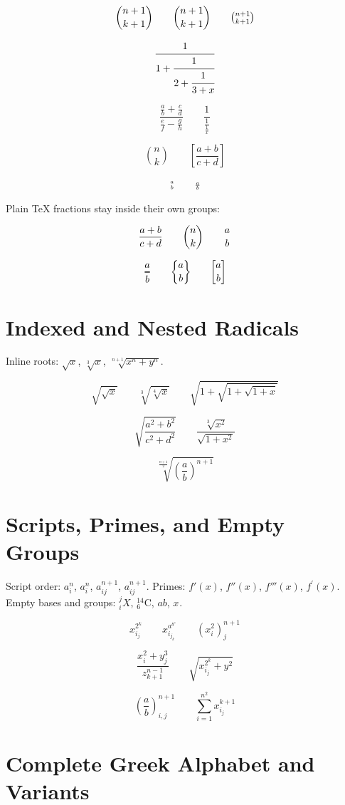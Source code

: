 \documentclass[12pt]{article}
\begin{document}
\[
\binom{n+1}{k+1} \qquad \dbinom{n+1}{k+1} \qquad \tbinom{n+1}{k+1}
\]

\[
\cfrac{1}{1+\cfrac{1}{2+\cfrac{1}{3+x}}}
\]

\[
\frac{\frac{a}{b}+\frac{c}{d}}{\frac{e}{f}-\frac{g}{h}}
\qquad \frac{1}{\frac{1}{\frac{1}{x}}}
\]

\[
\genfrac{(}{)}{0pt}{0}{n}{k}
\qquad \genfrac{[}{]}{0.8pt}{1}{a+b}{c+d}
\]

\[
\genfrac{}{}{0pt}{2}{a}{b}
\qquad \genfrac{}{}{0.4pt}{3}{a}{b}
\]

Plain TeX fractions stay inside their own groups:

\[
{a+b \over c+d} \qquad {n \choose k} \qquad {a \atop b}
\]

\[
{a \above 1pt b} \qquad {a \brace b} \qquad {a \brack b}
\]

\section{Indexed and Nested Radicals}

Inline roots: $\sqrt{x}$, $\sqrt[3]{x}$, $\sqrt[n+1]{x^n+y^n}$.

\[
\sqrt{\sqrt{x}} \qquad \sqrt[3]{\sqrt[4]{x}}
\qquad \sqrt{1+\sqrt{1+\sqrt{1+x}}}
\]

\[
\sqrt{\frac{a^2+b^2}{c^2+d^2}}
\qquad \frac{\sqrt[3]{x^2}}{\sqrt{1+x^2}}
\]

\[
\sqrt[\frac{n+1}{2}]{\left(\frac{a}{b}\right)^{n+1}}
\]

\section{Scripts, Primes, and Empty Groups}

Script order: $a_i^n$, $a^n_i$, $a_{ij}^{n+1}$, $a^{n+1}_{ij}$.
Primes: $f'(x)$, $f''(x)$, $f'''(x)$, $f^{\prime}(x)$.
Empty bases and groups: ${}_i^j X$, ${}^{14}_{6}\mathrm{C}$, $a{}b$, $x^{}$.

\[
x_{i_j}^{2^k} \qquad x_{i_{j_k}}^{a^{b^c}}
\qquad \left(x_i^2\right)_{j}^{n+1}
\]

\[
\frac{x_i^2+y_j^3}{z_{k+1}^{n-1}}
\qquad \sqrt{x_{i_j}^{2^k}+y^2}
\]

\[
\left(\frac{a}{b}\right)_{i,j}^{n+1}
\qquad \sum_{i=1}^{n^2} x_{i_j}^{k+1}
\]

\section{Complete Greek Alphabet and Variants}
\end{document}
